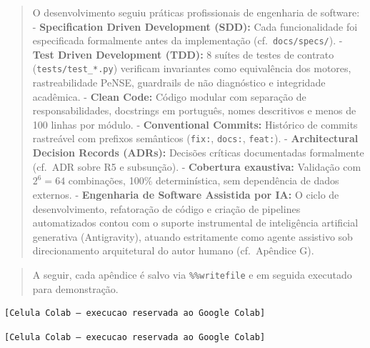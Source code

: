 \documentclass[11pt]{article}
\begin{document}
\begin{quote}
O desenvolvimento seguiu práticas profissionais de engenharia de
software: - \textbf{Specification Driven Development (SDD):} Cada
funcionalidade foi especificada formalmente antes da implementação
(cf.~\texttt{docs/specs/}). - \textbf{Test Driven Development (TDD):} 8
suítes de testes de contrato (\texttt{tests/test\_*.py}) verificam
invariantes como equivalência dos motores, rastreabilidade PeNSE,
guardrails de não diagnóstico e integridade acadêmica. - \textbf{Clean
Code:} Código modular com separação de responsabilidades, docstrings em
português, nomes descritivos e menos de 100 linhas por módulo. -
\textbf{Conventional Commits:} Histórico de commits rastreável com
prefixos semânticos (\texttt{fix:}, \texttt{docs:}, \texttt{feat:}). -
\textbf{Architectural Decision Records (ADRs):} Decisões críticas
documentadas formalmente (cf.~ADR sobre R5 e subsunção). -
\textbf{Cobertura exaustiva:} Validação com \(2^6 = 64\) combinações,
100\% determinística, sem dependência de dados externos. -
\textbf{Engenharia de Software Assistida por IA:} O ciclo de
desenvolvimento, refatoração de código e criação de pipelines
automatizados contou com o suporte instrumental de inteligência
artificial generativa (Antigravity), atuando estritamente como agente
assistivo sob direcionamento arquitetural do autor humano (cf.~Apêndice
G).
\end{quote}

\begin{quote}
A seguir, cada apêndice é salvo via \texttt{\%\%writefile} e em seguida
executado para demonstração.
\end{quote}

    \begin{Verbatim}[commandchars=\\\{\}]
[Celula Colab — execucao reservada ao Google Colab]
    \end{Verbatim}

    \begin{Verbatim}[commandchars=\\\{\}]
[Celula Colab — execucao reservada ao Google Colab]
    \end{Verbatim}
\end{document}
